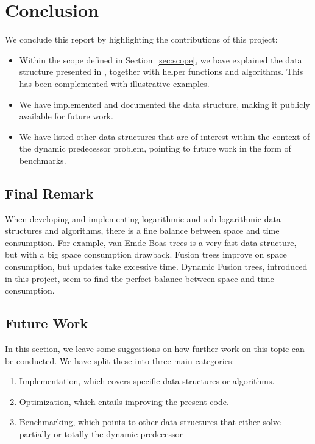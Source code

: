 \chapter{Conclusion} \label{sec:conclusionChapter}

We conclude this report by highlighting the contributions of this project:
\begin{itemize}
    \item
    Within the scope defined in Section~\ref{sec:scope}, we have explained the data structure presented in \cite{patrascu2014dynamic}, together with helper functions and algorithms. This has been complemented with illustrative examples.
    
    \item
    We have implemented and documented the data structure, making it publicly available for future work.
    
    \item
    We have listed other data structures that are of interest within the context of the dynamic predecessor problem, pointing to future work in the form of benchmarks.
\end{itemize}

\section{Final Remark}

When developing and implementing logarithmic and sub-logarithmic data structures and algorithms, there is a fine balance between space and time consumption. For example, van Emde Boas trees is a very fast data structure, but with a big space consumption drawback. Fusion trees improve on space consumption, but updates take excessive time. Dynamic Fusion trees, introduced in this project, seem to find the perfect balance between space and time consumption.

\section{Future Work} \label{sec:futureWork}
In this section, we leave some suggestions on how further work on this topic can be conducted. We have split these into three main categories:
\begin{enumerate}
    \item
    Implementation, which covers specific data structures or algorithms.
    
    \item
    Optimization, which entails improving the present code.
    
    \item
    Benchmarking, which points to other data structures that either solve partially or totally the dynamic predecessor 
    
\end{enumerate}

